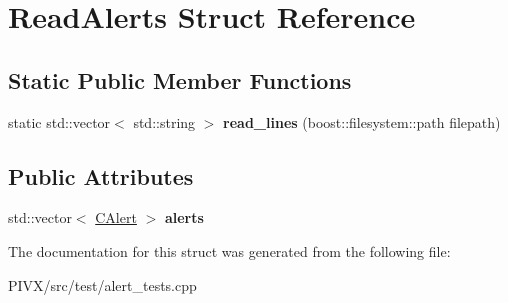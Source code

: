 \hypertarget{struct_read_alerts}{}\section{Read\+Alerts Struct Reference}
\label{struct_read_alerts}
\subsection*{Static Public Member Functions}
\begin{DoxyCompactItemize}
\item 
\mbox{\label{struct_read_alerts_a2c5cc409bd1b297282aea4ebdaee230b}} 
static std\+::vector$<$ std\+::string $>$ {\bfseries read\+\_\+lines} (boost\+::filesystem\+::path filepath)
\end{DoxyCompactItemize}
\subsection*{Public Attributes}
\begin{DoxyCompactItemize}
\item 
\mbox{\label{struct_read_alerts_a17f131ef314660af3de50cf098f34ee9}} 
std\+::vector$<$ \mbox{\hyperlink{class_c_alert}{C\+Alert}} $>$ {\bfseries alerts}
\end{DoxyCompactItemize}


The documentation for this struct was generated from the following file\+:\begin{DoxyCompactItemize}
\item 
P\+I\+V\+X/src/test/alert\+\_\+tests.\+cpp\end{DoxyCompactItemize}
